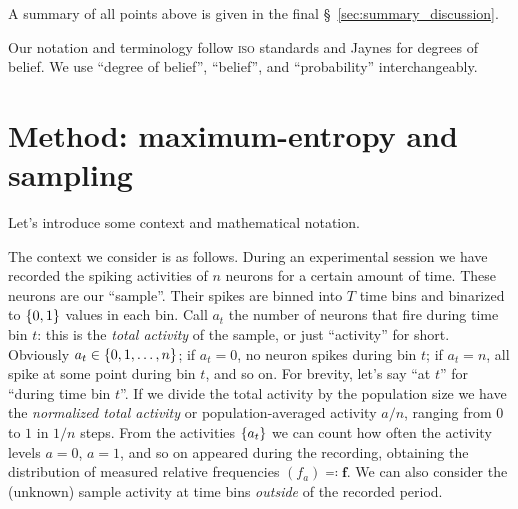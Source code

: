 \documentclass[\ifafour a4paper,12pt,\else a5paper,10pt,\fi%
onecolumn,oneside,article,%
british%
]{memoir}
\theoremstyle{remark}
\theoremstyle{innote}
\newcommand*{\citey}{\parencites*}
\newcommand*{\defs}{\eqqcolon}
\DeclarePairedDelimiter\set{\{}{\}}
\renewcommand*{\|}{\nonscript\,\vert\nonscript\;\mathopen{}}
\newcommand*{\sect}{\S}%
\newcommand*{\puzzle}{{\fontencoding{U}\fontfamily{fontawesometwo}\selectfont\symbol{225}}}
\newcommand{\mynote}[1]{ {\color{notecolour}\puzzle\ #1}}
\newcommand*{\dob}{degree of belief}
\newcommand*{\dobs}{degrees of belief}
\newcommand*{\yav}{a}
\newcommand*{\yff}{f}
\newcommand*{\yf}{\bm{\yff}}
\newcommand*{\ya}{\yav}%
\begin{document}
A summary of all points above is given in the final
\sect~\ref{sec:summary_discussion}.

\medskip


Our notation and terminology follow \textsc{iso}
\citey{iso1993,iso2006,iso2006b} standards and Jaynes
\citey{jaynes1994_r2003} for \dobs. We use \enquote{\dob},
\enquote{belief}, and \enquote{probability} interchangeably.












\section{Method: maximum-entropy and sampling}
\label{sec:model}

Let's introduce some context and mathematical notation.

The context we consider is as follows. During an experimental session we
have recorded the spiking activities of $n$ neurons for a certain amount of
time. These neurons are our \enquote{sample}. Their spikes are binned into
$T$ time bins and binarized to $\set{0,1}$ values in each bin. Call
$\ya_{t}$ the number of neurons that fire during time bin $t$: this is the
\emph{total activity} of the sample, or just \enquote{activity} for short.
Obviously $\ya_{t} \in\set{0,1,\dotsc,n}$; if $\ya_{t}=0$, no neuron spikes
during bin $t$; if $\ya_{t}=n$, all spike at some point during bin $t$, and
so on. For brevity, let's say \enquote{at $t$} for \enquote{during time bin
  $t$}. If we divide the total activity by the population size we have the
\emph{normalized total activity} or population-averaged activity $\ya/n$,
ranging from $0$ to $1$ in $1/n$ steps. From the activities $\set{\ya_{t}}$
we can count how often the activity levels $\ya=0$, $\ya=1$, and so on
appeared during the recording, obtaining the distribution of measured
relative frequencies $(\yff_{\ya}) \defs \yf$. We can also consider the
(unknown) sample activity at time bins \emph{outside} of the recorded
period.
\end{document}
